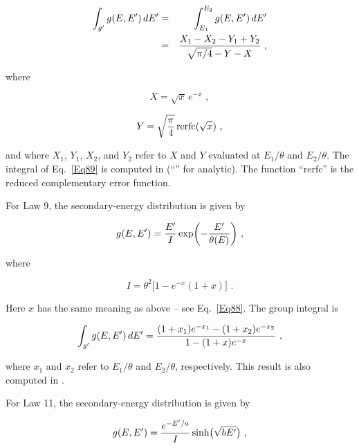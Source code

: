   \begin{eqnarray}
    \int_{g'}g(E,E')\,dE'&=&
    \int_{E_1}^{E_2}g(E,E')\,dE'\nonumber\\
    &=& {{X_1-X_2-Y_1+Y_2}\over{\sqrt{\pi/4}-Y-X}}\,\,,
  \label{Eq89}
  \end{eqnarray}

\noindent
where

  \begin{equation}
    X=\sqrt{x}\,e^{-x}\,\,,
  \end{equation}

  \begin{equation}
    Y=\sqrt{\pi \over 4}\,{\rm rerfc}(\sqrt{x})\,\,,
  \end{equation}

\noindent
and where $X_1$, $Y_1$, $X_2$, and $Y_2$ refer to $X$ and $Y$
evaluated at $E_1/\theta$ and $E_2/\theta$.  The integral of
Eq.~\ref{Eq89} is computed in 
(``'' for analytic).  The function ``rerfc'' is the reduced
complementary error function\cite{ref13}.

For Law 9, the secondary-energy distribution is given by

  \begin{equation}
    g(E,E')={{E'}\over{I}}\exp \biggl(-{{E'}\over{\theta(E)}} \biggr)\,\,,
  \end{equation}

\noindent
where

  \begin{equation}
    I=\theta^2 \bigl[ 1-e^{-x}(1+x) \bigr]\,\,.
  \end{equation}

\noindent
Here $x$ has the same meaning as above -- see Eq.~\ref{Eq88}.  The
group integral is

  \begin{equation}
    \int_{g'}g(E,E')\,dE'={{(1+x_1)e^{-x_1}-(1+x_2)e^{-x_2}}
    \over{1-(1+x)e^{-x}}}\,\,,
  \end{equation}

\noindent
where $x_1$ and $x_2$ refer to $E_1/\theta$ and $E_2/\theta$, respectively.
This result is also computed in .

For Law 11, the secondary-energy distribution is given by

  \begin{equation}
    g(E,E')={{e^{-E'/a}}\over I}\sinh\bigl(\sqrt{bE'}\bigr)\,\,,
  \end{equation}

